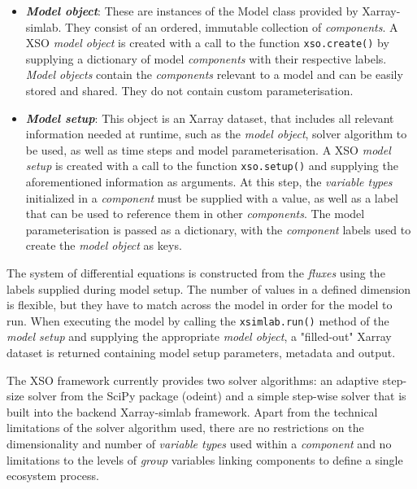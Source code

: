 \documentclass[journal abbreviation, manuscript]{copernicus}
\begin{document}
\begin{itemize}
    \item \textbf{\textit{Model object}}: These are instances of the Model class provided by Xarray-simlab. They consist of an ordered, immutable collection of \textit{components}. A XSO \textit{model object} is created with a call to the function \texttt{xso.create()} by supplying a dictionary of model \textit{components} with their respective labels. \textit{Model objects} contain the \textit{components} relevant to a model and can be easily stored and shared. They do not contain custom parameterisation.

   \item \textbf{\textit{Model setup}}: This object is an Xarray dataset, that includes all relevant information needed at runtime, such as the \textit{model object}, solver algorithm to be used, as well as time steps and model parameterisation. A XSO \textit{model setup} is created with a call to the function \texttt{xso.setup()} and supplying the aforementioned information as arguments. At this step, the \textit{variable types} initialized in a \textit{component} must be supplied with a value, as well as a label that can be used to reference them in other \textit{components}. The model parameterisation is passed as a dictionary, with the \textit{component} labels used to create the \textit{model object} as keys.
\end{itemize}

The system of differential equations is constructed from the \textit{fluxes} using the labels supplied during model setup. The number of values in a defined dimension is flexible, but they have to match across the model in order for the model to run. 
When executing the model by calling the \texttt{xsimlab.run()} method of the \textit{model setup} and supplying the appropriate \textit{model object}, a "filled-out" Xarray dataset is returned containing model setup parameters, metadata and output.


The XSO framework currently provides two solver algorithms: an adaptive step-size solver from the SciPy package (odeint) and a simple step-wise solver that is built into the backend Xarray-simlab framework. Apart from the technical limitations of the solver algorithm used, there are no restrictions on the dimensionality and number of \textit{variable types} used within a \textit{component} and no limitations to the levels of \textit{group} variables linking components to define a single ecosystem process. 
\end{document}

